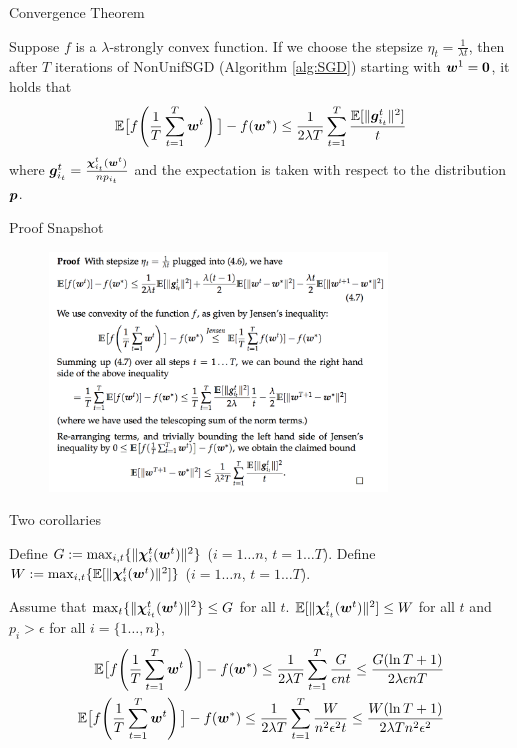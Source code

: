 \begin{frame}{Convergence Theorem}
\begin{theorem}
\label{theorem:basicSGD}
 Suppose $f$ is a $\lambda$-strongly convex function. If we choose the stepsize $\eta_t = \frac{1}{\lambda t }$, then after $T$ iterations of NonUnifSGD (Algorithm \ref{alg:SGD}) starting with $\bm{w}^{1}=\bm{0}$, it holds that
    \[
        \mathbb{E}\big[ f\!\left(\frac1T\sum_{t=1}^T \bm{w}^{t} \right) \big] - f(\bm{w}^*) \le \frac{1}{2\lambda T}\sum_{t=1}^T \frac{\mathbb{E}[\|\bm{g}_{i_t}^t\|^2]}{t}
    \]
    where $\bm{g}_{i_t}^t=\frac{\bm{\chi}_{i_t}^t(\bm{w}^{t})}{np_{i_t}}$ and the expectation is taken with respect to the distribution $\bm{p}$.
\end{theorem}
\end{frame}

\begin{frame}{Proof Snapshot}
\begin{figure}[H]
        \includegraphics[width = 0.8\textwidth]{images/snapshot.png} 
    \label{fig:two_updates}
\end{figure}
\end{frame}

\begin{frame}{Two corollaries}
\begin{definition}\label{def:WG}
Define $G := \max_{i, t}\{ \|\bm{\chi}_{i}^t(\bm{w}^{t})\|^2\}$ ($i = 1\dots n$, $t=1\dots T$).
Define $W := \max_{i,t}\{\mathbb{E}[\|\bm{\chi}_{i}^t(\bm{w}^{t})\|^2]\}$ ($i = 1\dots n$, $t=1\dots T$).
\end{definition}
\begin{corollary}\label{corollary:maxsubgrad}
Assume that $\max_{t}\{\|\bm{\chi}_{i_t}^t(\bm{w}^t)\|^2\} \le G$ for all $t$. $\mathbb{E}[\|\bm{\chi}_{i_t}^t(\bm{w}^t)\|^2] \le W$ for all $t$ and $p_i > \epsilon$ for all $i=\{1\dots, n\}$,
    \begin{align*}
        \mathbb{E}\big[f\!\left(\frac1T\sum_{t=1}^T \bm{w}^{t} \right)\big]- f(\bm{w}^*) \le \frac{1}{2\lambda T} \sum_{t=1}^T \frac{G}{\epsilon nt}
\le \frac{G(\ln T+1)}{2\lambda \epsilon nT}\\
        \mathbb{E}\big[f\!\left(\frac1T\sum_{t=1}^T \bm{w}^{t} \right)\big]- f(\bm{w}^*)  \le \frac{1}{2\lambda T}\sum_{t=1}^T \frac{W}{n^2\epsilon^2 t}
\le \frac{W(\ln T+1)}{2\lambda Tn^2\epsilon^2}
    \end{align*}
\end{corollary}
\end{frame}

